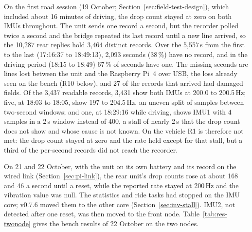 On the first road session (19 October; Section~\ref{sec:field-test-design}), which included about 16 minutes of driving, the drop count stayed at zero on both IMUs throughout. The unit sends one record a second, but the recorder polled twice a second and the bridge repeated its last record until a new line arrived, so the 10,287 rear replies hold 3,464 distinct records. Over the 5,557\,s from the first to the last (17:16:37 to 18:49:13), 2,093 seconds (38\,\%) have no record, and in the driving period (18:15 to 18:49) 67\,\% of seconds have one. The missing seconds are lines lost between the unit and the Raspberry Pi~4 over USB, the loss already seen on the bench (R10 below), and 27 of the records that arrived had damaged fields. Of the 3,437 readable records, 3,431 show both IMUs at 200.0 to 200.5\,Hz; five, at 18:03 to 18:05, show 197 to 204.5\,Hz, an uneven split of samples between two-second windows; and one, at 18:29:16 while driving, shows IMU1 with 4 samples in a 2\,s window instead of 400, a stall of nearly 2\,s that the drop count does not show and whose cause is not known. On the vehicle R1 is therefore not met: the drop count stayed at zero and the rate held except for that stall, but a third of the per-second records did not reach the recorder.

On 21 and 22 October, with the unit on its own battery and its record on the wired link (Section~\ref{sec:pi-link}), the rear unit's drop counts rose at about 168 and 46 a second until a reset, while the reported rate stayed at 200\,Hz and the vibration value was null. The statistics and ride tasks had stopped on the IMU core; v0.7.6 moved them to the other core (Section~\ref{sec:inv-stall}). IMU2, not detected after one reset, was then moved to the front node. Table~\ref{tab:res-twonode} gives the bench results of 22 October on the two nodes.

